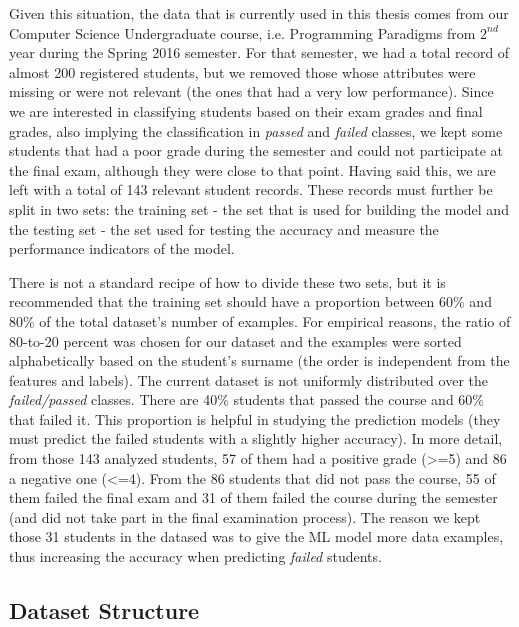 Given this situation, the data that is currently used in this thesis comes from our Computer Science 
Undergraduate course, i.e. Programming Paradigms from $2^{nd}$ year during 
the Spring 2016 semester. For that semester, we had a total record of almost 200  
registered students, but we removed those whose attributes were missing or were not relevant 
(the ones that had a very low performance).
Since we are interested in classifying students based on their exam grades and final grades, 
also implying the classification in {\it passed} and {\it failed} classes, 
we kept some students that had a poor grade during the semester and 
could not participate at the final exam, although they were close to that point. 
Having said this, we are left with a total of 143 relevant student records. 
These records must further be split in two sets: the training set - the set 
that is used for building the model and the testing set - the set used for 
testing the accuracy and measure the performance indicators of the model. 

There is not a standard recipe of how to divide these two sets, but it is 
recommended that the training set should have a proportion between 60\% and 
80\% of the total dataset's number of examples. For empirical reasons, the 
ratio of 80-to-20 percent was chosen for our dataset and the examples were sorted 
alphabetically based on the student's surname (the order is independent from the 
features and labels).
The current dataset is not uniformly distributed over the {\it failed/passed} 
classes. There are 40\% students that passed the course and 60\% that failed it.
This proportion is helpful in studying the prediction models (they must 
predict the failed students with a slightly higher accuracy). In more detail, 
from those 143 analyzed students, 57 of them had a positive grade (>=5) and 86 a 
negative one (<=4). From the 86 students that did not pass the course, 
55 of them failed the final exam and 31 of them failed the course during 
the semester (and did not take part in the final examination process). 
The reason we kept those 31 students in the datased was to give the ML 
model more data examples, thus increasing the accuracy when predicting 
{\it failed} students. 

\subsection{Dataset Structure}
\label{data_str}

